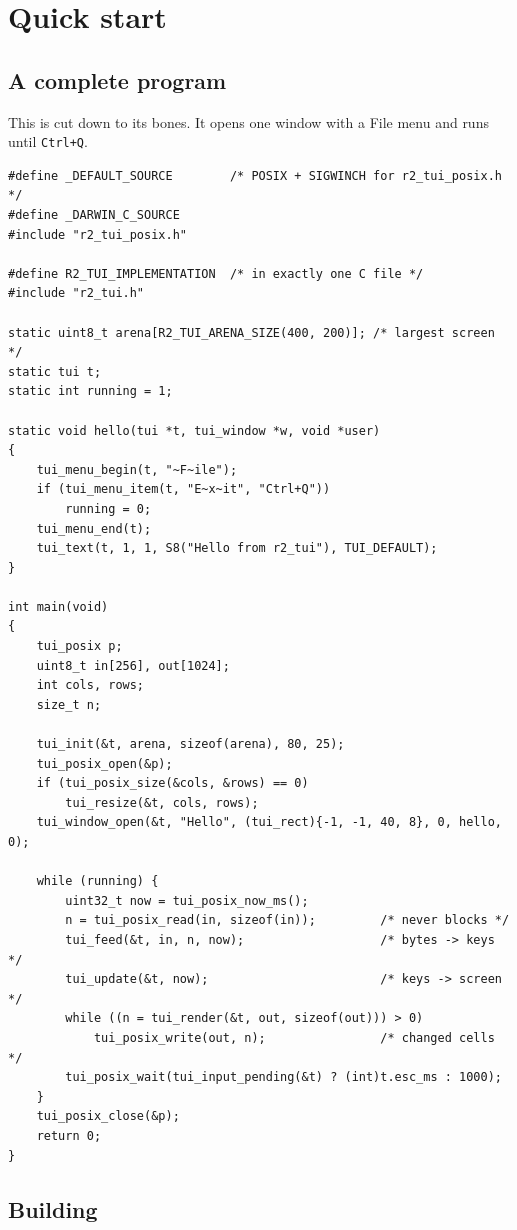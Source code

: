 \documentclass[11pt,a4paper]{article}
\newcommand{\fn}[1]{\texttt{\detokenize{#1}}}
\newcommand{\key}[1]{\texttt{#1}}
\begin{document}
\section{Quick start}

\subsection{A complete program}

This is \fn{examples/tui_app.c} cut down to its bones. It opens one window
with a File menu and runs until \key{Ctrl+Q}.

\begin{lstlisting}
#define _DEFAULT_SOURCE        /* POSIX + SIGWINCH for r2_tui_posix.h */
#define _DARWIN_C_SOURCE
#include "r2_tui_posix.h"

#define R2_TUI_IMPLEMENTATION  /* in exactly one C file */
#include "r2_tui.h"

static uint8_t arena[R2_TUI_ARENA_SIZE(400, 200)]; /* largest screen */
static tui t;
static int running = 1;

static void hello(tui *t, tui_window *w, void *user)
{
    tui_menu_begin(t, "~F~ile");
    if (tui_menu_item(t, "E~x~it", "Ctrl+Q"))
        running = 0;
    tui_menu_end(t);
    tui_text(t, 1, 1, S8("Hello from r2_tui"), TUI_DEFAULT);
}

int main(void)
{
    tui_posix p;
    uint8_t in[256], out[1024];
    int cols, rows;
    size_t n;

    tui_init(&t, arena, sizeof(arena), 80, 25);
    tui_posix_open(&p);
    if (tui_posix_size(&cols, &rows) == 0)
        tui_resize(&t, cols, rows);
    tui_window_open(&t, "Hello", (tui_rect){-1, -1, 40, 8}, 0, hello, 0);

    while (running) {
        uint32_t now = tui_posix_now_ms();
        n = tui_posix_read(in, sizeof(in));         /* never blocks */
        tui_feed(&t, in, n, now);                   /* bytes -> keys */
        tui_update(&t, now);                        /* keys -> screen */
        while ((n = tui_render(&t, out, sizeof(out))) > 0)
            tui_posix_write(out, n);                /* changed cells */
        tui_posix_wait(tui_input_pending(&t) ? (int)t.esc_ms : 1000);
    }
    tui_posix_close(&p);
    return 0;
}
\end{lstlisting}

\subsection{Building}
\end{document}
